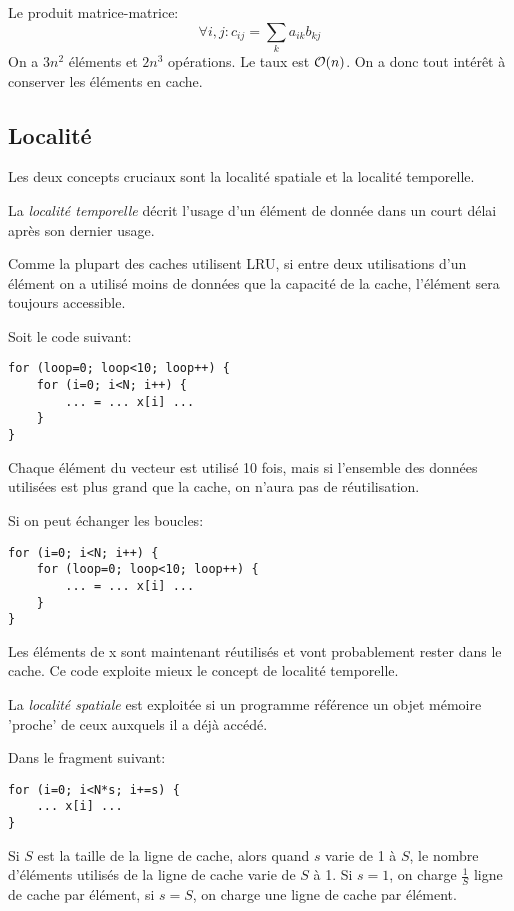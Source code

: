 Le produit matrice-matrice:
\begin{equation}
\forall i,j : c_{i j} = \sum_k a_{i k} b_{k j}
\end{equation}
On a $3n^2$ éléments et $2n^3$ opérations.
Le taux est $\mathcal{O}(n)$. On a donc tout intérêt à conserver les éléments en cache.

	\subsection{Localité}

Les deux concepts cruciaux sont la localité spatiale et la localité temporelle. 

La \textit{localité temporelle} décrit l'usage d'un élément de donnée dans un court délai après son dernier usage.

Comme la plupart des caches utilisent LRU, si entre deux utilisations d'un élément on a utilisé moins de données que la capacité de la cache, l'élément sera toujours accessible.

Soit le code suivant:
\begin{verbatim}
for (loop=0; loop<10; loop++) {
    for (i=0; i<N; i++) {
        ... = ... x[i] ...
    }
}
\end{verbatim}

Chaque élément du vecteur est utilisé 10 fois, mais si l'ensemble des données utilisées est plus grand que la cache, on n'aura pas de réutilisation. 

Si on peut échanger les boucles:
\begin{verbatim}
for (i=0; i<N; i++) {
    for (loop=0; loop<10; loop++) {
        ... = ... x[i] ...
    }
}
\end{verbatim}
Les éléments de x sont maintenant réutilisés et vont probablement rester dans le cache. Ce code exploite mieux le concept de localité temporelle.

La \textit{localité spatiale} est exploitée si un programme référence un objet mémoire 'proche' de ceux auxquels il a déjà accédé. 


Dans le fragment suivant:
\begin{verbatim}
for (i=0; i<N*s; i+=s) {
    ... x[i] ...
}
\end{verbatim}

Si $S$ est la taille de la ligne de cache, alors quand $s$ varie de 1 à $S$, le nombre d'éléments utilisés de la ligne de cache varie de $S$ à 1. Si $s=1$, on charge $\frac{1}{S}$ ligne de cache par élément, si $s = S$, on charge une ligne de cache par élément.

